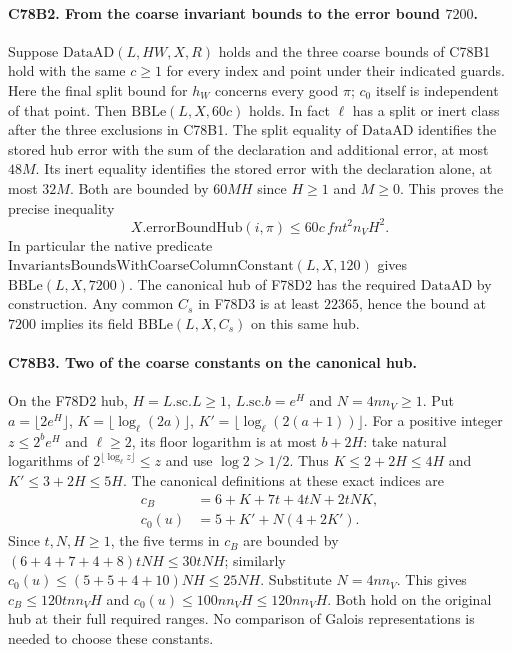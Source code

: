 \paragraph{C78B2. From the coarse invariant bounds to the error bound $7200$.}
Suppose $\mathrm{DataAD}(L,HW,X,R)$ holds and the three coarse
bounds of C78B1 hold with the same $c\ge1$ for every index and
point under their indicated guards. Here the final split bound for
$h_W$ concerns every good $\pi$; $c_0$ itself is independent of
that point. Then $\mathrm{BBLe}(L,X,60c)$ holds. In fact $\ell$
has a split or inert class after the three exclusions in C78B1.
The split equality of $\mathrm{DataAD}$ identifies the stored hub
error with the sum of the declaration and additional error, at most
$48M$. Its inert equality identifies the stored error with the
declaration alone, at most $32M$. Both are bounded by $60MH$ since
$H\ge1$ and $M\ge0$. This proves the precise inequality
\[
 X.\mathrm{errorBoundHub}(i,\pi)\le 60c\,fn t^2 n_V H^2 .
\]
In particular the native predicate
$\mathrm{InvariantsBoundsWithCoarseColumnConstant}(L,X,120)$ gives
$\mathrm{BBLe}(L,X,7200)$. The canonical hub of F78D2 has the
required $\mathrm{DataAD}$ by construction. Any common $C_s$ in F78D3
is at least $22365$, hence the bound at $7200$ implies its field
$\mathrm{BBLe}(L,X,C_s)$ on this same hub.

\paragraph{C78B3. Two of the coarse constants on the canonical hub.}
On the F78D2 hub, $H=L.\mathrm{sc}.L\ge1$,
$L.\mathrm{sc}.b=e^H$ and $N=4nn_V\ge1$. Put
$a=\lfloor2e^H\rfloor$, $K=\lfloor\log_\ell(2a)\rfloor$,
$K'=\lfloor\log_\ell(2(a+1))\rfloor$.
For a positive integer $z\le 2^b e^H$ and $\ell\ge2$, its floor
logarithm is at most $b+2H$: take natural logarithms of
$2^{\lfloor\log_\ell z\rfloor}\le z$ and use $\log 2>1/2$.
Thus $K\le2+2H\le4H$ and $K'\le3+2H\le5H$.
The canonical definitions at these exact indices are
\[
 \begin{split}
 c_B&=6+K+7t+4tN+2tNK,\\
 c_0(u)&=5+K'+N(4+2K').
 \end{split}
\]
Since $t,N,H\ge1$, the five terms in $c_B$ are bounded by
$(6+4+7+4+8)tNH\le30tNH$; similarly
$c_0(u)\le(5+5+4+10)NH\le25NH$.
Substitute $N=4nn_V$. This gives $c_B\le120tnn_VH$ and
$c_0(u)\le100nn_VH\le120nn_VH$. Both hold on the original hub
at their full required ranges. No comparison of Galois
representations is needed to choose these constants.

